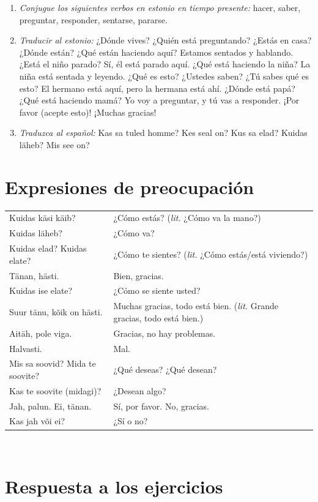 \begin{enumerate}
	\item \emph{Conjugue los siguientes verbos en estonio en tiempo presente:} hacer, saber, preguntar, responder, sentarse, pararse.
	\item \emph{Traducir al estonio:} ¿Dónde vives? ¿Quién está preguntando? ¿Estás en casa? ¿Dónde están? ¿Qué están haciendo aquí? Estamos sentados y hablando. ¿Está el niño parado? Sí, él está parado aquí. ¿Qué está haciendo la niña? La niña está sentada y leyendo. ¿Qué es esto? ¿Ustedes saben? ¿Tú sabes qué es esto? El hermano está aquí, pero la hermana está ahí. ¿Dónde está papá? ¿Qué está haciendo mamá? Yo voy a preguntar, y tú vas a responder. ¡Por favor (acepte esto)! ¡Muchas gracias!
	\item \emph{Traduzca al español:} Kas sa tuled homme? Kes seal on? Kus sa elad? Kuidas läheb? Mis see on? 
\end{enumerate}

\section*{\Large{Expresiones de preocupación}}

\begin{tabular}{ l p{6.5cm} }
	Kuidas käsi käib?				& ¿Cómo estás? (\emph{lit.} ¿Cómo va la mano?) \\
	Kuidas läheb?					& ¿Cómo va? \\
	Kuidas elad? Kuidas elate?		& ¿Cómo te sientes? (\emph{lit.} ¿Cómo estás/está viviendo?) \\
	Tänan, hästi.					& Bien, gracias. \\
	Kuidas ise elate?				& ¿Cómo se siente usted? \\
	Suur tänu, kõik on hästi.		& Muchas gracias, todo está bien. (\emph{lit.} Grande gracias, todo está bien.) \\
	Aitäh, pole viga.				& Gracias, no hay problemas. \\
	Halvasti.						& Mal. \\
	Mis sa soovid? Mida te soovite? & ¿Qué deseas? ¿Qué desean? \\
	Kas te soovite (midagi)?		& ¿Desean algo? \\
	Jah, palun. Ei, tänan.			& Sí, por favor. No, gracias. \\
	Kas jah või ei?					& ¿Sí o no?
\end{tabular}\\ \bigskip

\section*{\Large{Respuesta a los ejercicios}}

